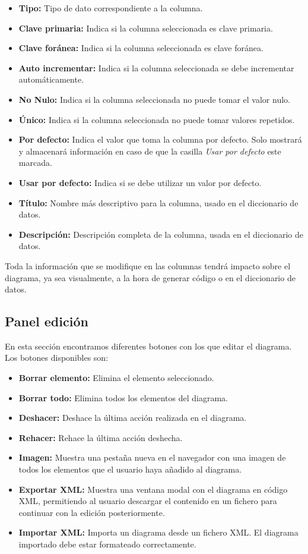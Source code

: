 \begin{itemize}
    \item \textbf{Tipo: }Tipo de dato correspondiente a la columna.
    \item \textbf{Clave primaria: }Indica si la columna seleccionada es clave primaria.
    \item \textbf{Clave foránea: }Indica si la columna seleccionada es clave foránea.
    \item \textbf{Auto incrementar: }Indica si la columna seleccionada se debe incrementar automáticamente.
    \item \textbf{No Nulo: }Indica si la columna seleccionada no puede tomar el valor nulo.
    \item \textbf{Único: }Indica si la columna seleccionada no puede tomar valores repetidos.
    \item \textbf{Por defecto: }Indica el valor que toma la columna por defecto. Solo mostrará y almacenará información en caso de que la casilla \textit{Usar por defecto} este marcada.
    \item \textbf{Usar por defecto: }Indica si se debe utilizar un valor por defecto.
    \item \textbf{Título: }Nombre más descriptivo para la columna, usado en el diccionario de datos.
    \item \textbf{Descripción: }Descripción completa de la columna, usada en el diccionario de datos.
\end{itemize}

Toda la información que se modifique en las columnas tendrá impacto sobre el diagrama, ya sea visualmente, a la hora de generar código o en el diccionario de datos.

\subsection{Panel edición}


En esta sección encontramos diferentes botones con los que editar el diagrama. Los botones disponibles son:
\begin{itemize}
    \item \textbf{Borrar elemento: }Elimina el elemento seleccionado.
    \item \textbf{Borrar todo: }Elimina todos los elementos del diagrama.
    \item \textbf{Deshacer: }Deshace la última acción realizada en el diagrama.
    \item \textbf{Rehacer: }Rehace la última acción deshecha.
    \item \textbf{Imagen: }Muestra una pestaña nueva en el navegador con una imagen de todos los elementos que el usuario haya añadido al diagrama.
    \item \textbf{Exportar XML: }Muestra una ventana modal con el diagrama en código XML, permitiendo al usuario descargar el contenido en un fichero para continuar con la edición posteriormente.
    \item \textbf{Importar XML: }Importa un diagrama desde un fichero XML. El diagrama importado debe estar formateado correctamente.
\end{itemize}

